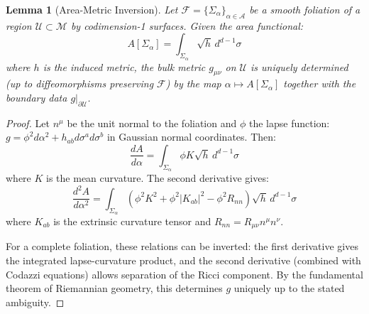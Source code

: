 \documentclass[12pt,a4paper]{article}
\newtheorem{lemma}[theorem]{Lemma}
\begin{document}
\begin{lemma}[Area-Metric Inversion]\label{lem:area-inversion}
Let $\mathcal{F} = \{\Sigma_\alpha\}_{\alpha \in \mathcal{A}}$ be a smooth foliation of a region $\mathcal{U} \subset \mathcal{M}$ by codimension-1 surfaces. Given the area functional:
\begin{equation}
A[\Sigma_\alpha] = \int_{\Sigma_\alpha} \sqrt{h} \, d^{d-1}\sigma
\end{equation}
where $h$ is the induced metric, the bulk metric $g_{\mu\nu}$ on $\mathcal{U}$ is uniquely determined (up to diffeomorphisms preserving $\mathcal{F}$) by the map $\alpha \mapsto A[\Sigma_\alpha]$ together with the boundary data $g|_{\partial\mathcal{U}}$.
\end{lemma}

\begin{proof}
Let $n^\mu$ be the unit normal to the foliation and $\phi$ the lapse function: $g = \phi^2 d\alpha^2 + h_{ab} d\sigma^a d\sigma^b$ in Gaussian normal coordinates. Then:
\begin{equation}
\frac{dA}{d\alpha} = \int_{\Sigma_\alpha} \phi K \sqrt{h} \, d^{d-1}\sigma
\end{equation}
where $K$ is the mean curvature. The second derivative gives:
\begin{equation}
\frac{d^2 A}{d\alpha^2} = \int_{\Sigma_\alpha} \left( \phi^2 K^2 + \phi^2 |K_{ab}|^2 - \phi^2 R_{nn} \right) \sqrt{h} \, d^{d-1}\sigma
\end{equation}
where $K_{ab}$ is the extrinsic curvature tensor and $R_{nn} = R_{\mu\nu}n^\mu n^\nu$.

For a complete foliation, these relations can be inverted: the first derivative gives the integrated lapse-curvature product, and the second derivative (combined with Codazzi equations) allows separation of the Ricci component. By the fundamental theorem of Riemannian geometry, this determines $g$ uniquely up to the stated ambiguity.
\end{proof}
\end{document}
